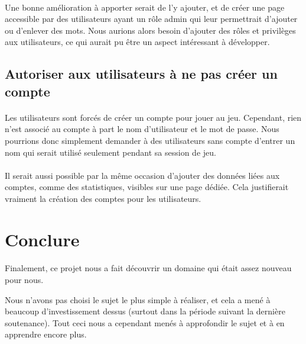 \documentclass[11pt,a4paper]{article}
\begin{document}
            \paragraph{}
            Une bonne amélioration à apporter serait de l'y ajouter,
            et de créer une page accessible par des utilisateurs ayant un rôle admin qui leur permettrait d'ajouter ou d'enlever des mots.
            Nous aurions alors besoin d'ajouter des rôles et privilèges aux utilisateurs,
            ce qui aurait pu être un aspect intéressant à développer.
        \subsection*{Autoriser aux utilisateurs à ne pas créer un compte}
            \paragraph{}
            Les utilisateurs sont forcés de créer un compte pour jouer au jeu.
            Cependant, rien n'est associé au compte à part le nom d'utilisateur et le mot de passe.
            Nous pourrions donc simplement demander à des utilisateurs sans compte d'entrer un nom
            qui serait utilisé seulement pendant sa session de jeu.
            \paragraph{}
            Il serait aussi possible par la même occasion d'ajouter des données liées aux comptes,
            comme des statistiques, visibles sur une page dédiée.
            Cela justifierait vraiment la création des comptes pour les utilisateurs.
    \section{Conclure}
        \paragraph{}
        Finalement, ce projet nous a fait découvrir un domaine qui était assez nouveau pour nous.

        Nous n'avons pas choisi le sujet le plus simple à réaliser,
        et cela a mené à beaucoup d'investissement dessus (surtout dans la période suivant la dernière soutenance).
        Tout ceci nous a cependant menés à approfondir le sujet et à en apprendre encore plus.
\end{document}
